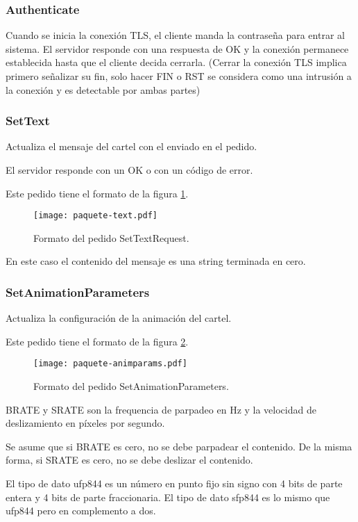 \subsubsection{Authenticate}
Cuando se inicia la conexión TLS, el cliente manda la contraseña para entrar al sistema. El servidor responde con una respuesta de OK y la conexión permanece establecida hasta que el cliente decida cerrarla. (Cerrar la conexión TLS implica primero señalizar su fin, solo hacer FIN o RST se considera como una intrusión a la conexión y es detectable por ambas partes)

\subsubsection{SetText}
Actualiza el mensaje del cartel con el enviado en el pedido.

El servidor responde con un OK o con un código de error.

Este pedido tiene el formato de la figura \ref{fig:paquete-text}.
\begin{figure}[h]
	\centering
	\texttt{[image: paquete-text.pdf]}
	\caption{Formato del pedido SetTextRequest.}
	\label{fig:paquete-text}
\end{figure}

En este caso el contenido del mensaje es una string terminada en cero.

\subsubsection{SetAnimationParameters}
Actualiza la configuración de la animación del cartel.

Este pedido tiene el formato de la figura \ref{fig:paquete-animparams}.
\begin{figure}[h]
	\centering
	\texttt{[image: paquete-animparams.pdf]}
	\caption{Formato del pedido SetAnimationParameters.}
	\label{fig:paquete-animparams}
\end{figure}

BRATE y SRATE son la frequencia de parpadeo en Hz y la velocidad de deslizamiento en píxeles por segundo.

Se asume que si BRATE es cero, no se debe parpadear el contenido. De la misma forma, si SRATE es cero, no se debe deslizar el contenido.

El tipo de dato ufp844 es un número en punto fijo sin signo con 4 bits de parte entera y 4 bits de parte fraccionaria. El tipo de dato sfp844 es lo mismo que ufp844 pero en complemento a dos.

